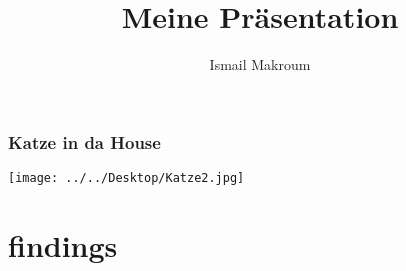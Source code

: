 \documentclass[german]{beamer}
\author{Ismail Makroum}
\title{Meine Präsentation \ch{CO2}\\}
\institute{Oberpfaffenhofen}
\begin{document}
\begin{frame}
\maketitle
\end{frame}



\begin{frame}
\frametitle{Katze in da House}

\begin{center}
\texttt{[image: ../../Desktop/Katze2.jpg]}
\end{center}
\end{frame}

\section{findings}
\end{document}

